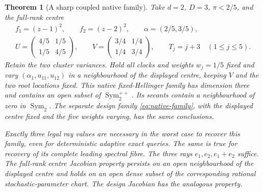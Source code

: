 \documentclass[11pt,reqno]{amsart}
\numberwithin{equation}{section}
\newtheorem{theorem}{Theorem}[section]
\theoremstyle{definition}
\theoremstyle{remark}
\newcommand{\Sym}{\operatorname{Sym}}
\begin{document}
\begin{theorem}[A sharp coupled native family]\label{thm:native}
Take $d=2$, $D=3$, $\pi<2/5$, and the full-rank centre
\begin{gather*}
 f_1=(z-1)^2,\qquad f_2=(z-2)^2,\qquad \alpha=(2/5,3/5),\\
 U=\begin{pmatrix}4/5&1/5\\1/5&4/5\end{pmatrix},\qquad
 V=\begin{pmatrix}3/4&1/4\\1/4&3/4\end{pmatrix},\qquad T_j=j+3\quad(1\le j\le5).
\end{gather*}
Retain the two cluster variances. Hold all clocks and weights $w_j=1/5$ fixed and vary $(\alpha_1,u_{11},u_{12})$ in a neighbourhood of the displayed centre, keeping $V$ and the two root locations fixed. This native fixed-Hellinger family has dimension three and contains an open subset of $\Sym_2^{++}$. Its secants contain a neighbourhood of zero in $\Sym_2$. The separate design family \eqref{eq:native-family}, with the displayed centre fixed and the five weights varying, has the same conclusions.

Exactly three legal ray values are necessary in the worst case to recover this family, even for deterministic adaptive exact queries. The same is true for recovery of its complete leading spectral fibre. The three rays $e_1,e_2,e_1+e_2$ suffice. The full-rank centre Jacobian property persists on an open neighbourhood of the displayed centre and holds on an open dense subset of the corresponding rational stochastic-parameter chart. The design Jacobian has the analogous property.
\end{theorem}
\end{document}
